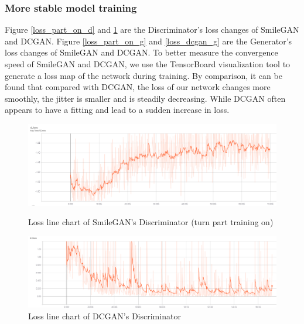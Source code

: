 \subsubsection*{More stable model training}
Figure \ref{loss_part_on_d} and \ref{loss_dcgan_d} are the Discriminator's loss changes of SmileGAN and DCGAN.
Figure \ref{loss_part_on_g} and \ref{loss_dcgan_g} are the Generator's loss changes of SmileGAN and DCGAN.
To better measure the convergence speed of SmileGAN and DCGAN, we use the TensorBoard visualization tool to generate a loss map of the network during training.
By comparison, it can be found that compared with DCGAN, the loss of our network changes more smoothly, the jitter is smaller and is steadily decreasing.
While DCGAN often appears to have a fitting and lead to a sudden increase in loss.

\begin{figure}
    \begin{minipage}[t]{0.49\linewidth}
        \centering
        \includegraphics[width=\textwidth]{figures/loss_part_on_d.png}
        \caption{Loss line chart of SmileGAN's Discriminator (turn part training on)}
        \label{loss_part_on_d}
    \end{minipage}
        \hfill
    \begin{minipage}[t]{0.49\linewidth}
        \centering
        \includegraphics[width=\textwidth]{figures/loss_dcgan_d.png}
        \caption{Loss line chart of DCGAN's Discriminator}
        \label{loss_dcgan_d}
    \end{minipage}
\end{figure}

